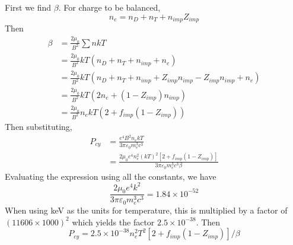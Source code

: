 \documentclass[answers]{exam}
\begin{document}
\begin{questions}

\begin{solution}
    First we find $\beta$. For charge to be balanced,
    $$n_e = n_D + n_T + n_{imp}Z_{imp}$$
    Then
    \begin{align*}
        \beta &= \frac{2\mu_0}{B^2} \sum nkT \\
              &= \frac{2\mu_0}{B^2} kT(n_D + n_T + n_{imp} + n_e) \\
              &= \frac{2\mu_0}{B^2} kT(n_D + n_T + n_{imp} + Z_{imp}n_{imp} - Z_{imp}n_{imp} + n_e) \\
              &= \frac{2\mu_0}{B^2} kT(2n_e + (1 - Z_{imp})n_{imp}) \\
              &= \frac{2\mu_0}{B^2} n_ekT(2 + f_{imp}(1 - Z_{imp}))
    \end{align*}
    Then substituting,
    \begin{align*}
        P_{cy} &= \frac{e^4B^2n_ekT}{3\pi\varepsilon_0m_e^3c^3} \\
               &= \frac{2\mu_0e^4n_e^2(kT)^2[2+f_{imp}(1-Z_{imp})]}{3\pi\varepsilon_0m_e^3c^3\beta}
    \end{align*}
    Evaluating the expression using all the constants, we have
    $$\frac{2\mu_0e^4k^2}{3\pi\varepsilon_0m_e^3c^3} = 1.84 \times 10^{-52}$$
    When using keV as the units for temperature, this is multiplied by a factor of $(11606 \times 1000)^2$ which yields the factor $2.5 \times 10^{-38}$. Then
    $$P_{cy} = 2.5 \times 10^{-38} n_e^2T^2[2 + f_{imp}(1 - Z_{imp})]/\beta$$
\end{solution}



\end{questions}
\end{document}
